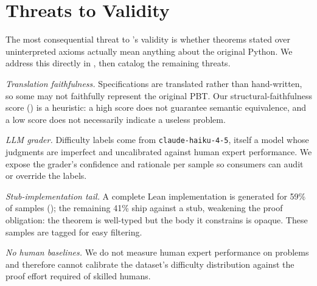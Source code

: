 \section{Threats to Validity}
\label{sec:threats}

The most consequential threat to \FVSpec's validity is whether theorems stated over uninterpreted axioms actually mean anything about the original Python. We address this directly in , then catalog the remaining threats.


\emph{Translation faithfulness.} Specifications are translated rather than hand-written, so some may not faithfully represent the original PBT. Our structural-faithfulness score () is a heuristic: a high score does not guarantee semantic equivalence, and a low score does not necessarily indicate a useless problem.

\emph{LLM grader.} Difficulty labels come from \texttt{claude-haiku-4-5}, itself a model whose judgments are imperfect and uncalibrated against human expert performance. We expose the grader's confidence and rationale per sample so consumers can audit or override the labels.

\emph{Stub-implementation tail.} A complete Lean implementation is generated for 59\% of samples (); the remaining 41\% ship against a stub, weakening the proof obligation: the theorem is well-typed but the body it constrains is opaque. These samples are tagged for easy filtering.

\emph{No human baselines.} We do not measure human expert performance on \FVSpec problems and therefore cannot calibrate the dataset's difficulty distribution against the proof effort required of skilled humans.
